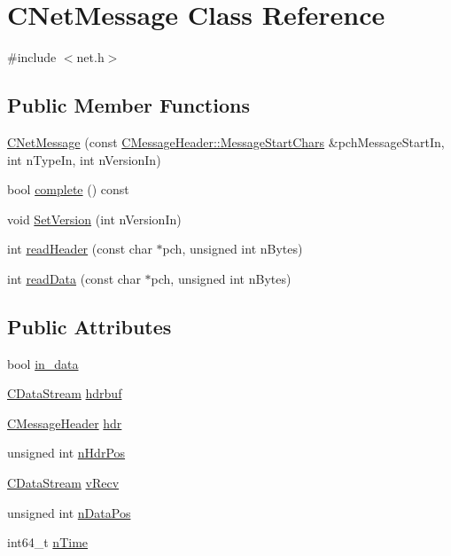 \hypertarget{class_c_net_message}{}\section{C\+Net\+Message Class Reference}
\label{class_c_net_message}


{\ttfamily \#include $<$net.\+h$>$}

\subsection*{Public Member Functions}
\begin{DoxyCompactItemize}
\item 
\mbox{\hyperlink{class_c_net_message_a19f23086d183f2f62d0371960b48c105}{C\+Net\+Message}} (const \mbox{\hyperlink{class_c_message_header_a0d0eeb540cbf4087973f6652ad61878f}{C\+Message\+Header\+::\+Message\+Start\+Chars}} \&pch\+Message\+Start\+In, int n\+Type\+In, int n\+Version\+In)
\item 
bool \mbox{\hyperlink{class_c_net_message_ae3b5f6110ae9a3c06397894cd46ab224}{complete}} () const
\item 
void \mbox{\hyperlink{class_c_net_message_a63b9f2351d5e92126cacacd51d9e16b6}{Set\+Version}} (int n\+Version\+In)
\item 
int \mbox{\hyperlink{class_c_net_message_a3e58f5f29b23d1377f8fd15fc75c78ac}{read\+Header}} (const char $\ast$pch, unsigned int n\+Bytes)
\item 
int \mbox{\hyperlink{class_c_net_message_adbc1669a56462daea5f37e5e99117f8c}{read\+Data}} (const char $\ast$pch, unsigned int n\+Bytes)
\end{DoxyCompactItemize}
\subsection*{Public Attributes}
\begin{DoxyCompactItemize}
\item 
bool \mbox{\hyperlink{class_c_net_message_a8f399ad7225f980bdab3ede17b1b23af}{in\+\_\+data}}
\item 
\mbox{\hyperlink{class_c_data_stream}{C\+Data\+Stream}} \mbox{\hyperlink{class_c_net_message_a80a6f95f0c187aa97788118248cbf452}{hdrbuf}}
\item 
\mbox{\hyperlink{class_c_message_header}{C\+Message\+Header}} \mbox{\hyperlink{class_c_net_message_ae7215dca62862a3688f7eeb94646c377}{hdr}}
\item 
unsigned int \mbox{\hyperlink{class_c_net_message_a1a500121037490eec4b238906f3a23ad}{n\+Hdr\+Pos}}
\item 
\mbox{\hyperlink{class_c_data_stream}{C\+Data\+Stream}} \mbox{\hyperlink{class_c_net_message_a1a25c16099d01362e1663390a2e06d1a}{v\+Recv}}
\item 
unsigned int \mbox{\hyperlink{class_c_net_message_a418f59287d1805dda6959f27a170c855}{n\+Data\+Pos}}
\item 
int64\+\_\+t \mbox{\hyperlink{class_c_net_message_a99d5bbca862ac4b7a88b71a7b679decc}{n\+Time}}
\end{DoxyCompactItemize}


